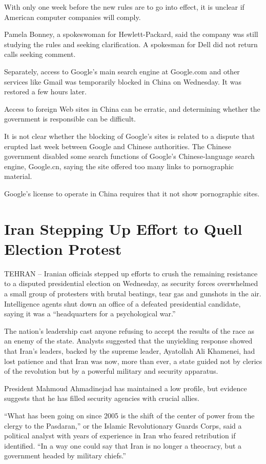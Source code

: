 ﻿\documentclass[12pt]{article}
\begin{document}
With only one week before the new rules are to go into effect, it is unclear if American computer
companies will comply.

Pamela Bonney, a spokeswoman for Hewlett-Packard, said the company was still studying the rules and
seeking clarification. A spokesman for Dell did not return calls seeking comment.

Separately, access to Google's main search engine at Google.com and other services like Gmail was
temporarily blocked in China on Wednesday. It was restored a few hours later.

Access to foreign Web sites in China can be erratic, and determining whether the government is
responsible can be difficult.

It is not clear whether the blocking of Google's sites is related to a dispute that erupted last
week between Google and Chinese authorities. The Chinese government disabled some search functions
of Google's Chinese-language search engine, Google.cn, saying the site offered too many links to
pornographic material.

Google's license to operate in China requires that it not show pornographic sites.

\section{Iran Stepping Up Effort to Quell Election Protest}

TEHRAN -- Iranian officials stepped up efforts to crush the remaining resistance to a disputed
presidential election on Wednesday, as security forces overwhelmed a small group of protesters with
brutal beatings, tear gas and gunshots in the air. Intelligence agents shut down an office of a
defeated presidential candidate, saying it was a ``headquarters for a psychological war.''

The nation's leadership cast anyone refusing to accept the results of the race as an enemy of the
state. Analysts suggested that the unyielding response showed that Iran's leaders, backed by the
supreme leader, Ayatollah Ali Khamenei, had lost patience and that Iran was now, more than ever, a
state guided not by clerics of the revolution but by a powerful military and security apparatus.

President Mahmoud Ahmadinejad has maintained a low profile, but evidence suggests that he has filled
security agencies with crucial allies.

``What has been going on since 2005 is the shift of the center of power from the clergy to the
Pasdaran,'' or the Islamic Revolutionary Guards Corps, said a political analyst with years of
experience in Iran who feared retribution if identified. ``In a way one could say that Iran is no
longer a theocracy, but a government headed by military chiefs.''
\end{document}
